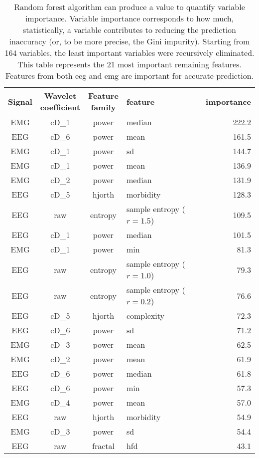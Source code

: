 \begin {table}[!h]
\begin{center}
\caption{
Random forest algorithm can produce a value to quantify variable importance.
Variable importance corresponds to how much, statistically, a variable contributes to reducing the prediction inaccuracy (or, to be more precise, the Gini impurity).
Starting from 164 variables, the least important variables were recursively eliminated.
This table represents the 21 most important remaining features.
Features from both \gls{eeg} and \gls{emg} are important for accurate prediction.
\label{tab:importances}}

\small
\begin{tabular}{|c|c|c|l|r|}
  \hline
 Signal & \specialcell{Wavelet\\coefficient} & \specialcell{Feature\\family}  & feature & importance\\
\hline
\hline
EMG & cD\_1 & power & median & 222.2\\
EEG & cD\_6 & power & mean & 161.5\\
EMG & cD\_1 & power & sd &  144.7\\
EMG & cD\_1 & power & mean & 136.9\\
EMG & cD\_2 & power & median & 131.9\\
EEG & cD\_5 & hjorth & morbidity & 128.3\\
EEG & raw & entropy & sample entropy ($r=1.5$) & 109.5\\
EEG & cD\_1 & power & median & 101.5\\
EMG & cD\_1 & power & min & 81.3\\
EEG & raw & entropy & sample entropy ($r=1.0$) & 79.3\\
EEG & raw & entropy & sample entropy ($r=0.2$) & 76.6\\
EEG & cD\_5 & hjorth & complexity & 72.3\\
EEG & cD\_6 & power & sd & 71.2\\
EMG & cD\_3 & power & mean & 62.5\\
EMG & cD\_2 & power & mean & 61.9\\
EEG & cD\_6 & power & median & 61.8\\
EEG & cD\_6 & power & min & 57.3\\
EMG & cD\_4 & power & mean & 57.0\\
EEG & raw & hjorth & morbidity & 54.9\\
EMG & cD\_3 & power & sd & 54.4\\
EEG & raw & fractal & hfd & 43.1\\
\hline
 


\end{tabular}
\end{center}
\end{table}

